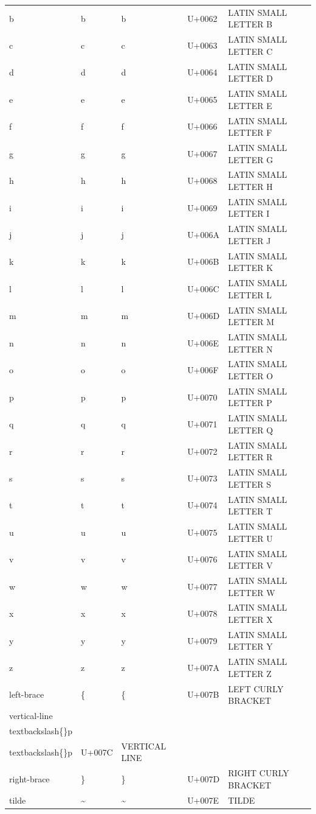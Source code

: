 \documentclass{article}
\begin{document}
\begin{tabular}{lllll}
b & b & b & U+0062 & LATIN SMALL LETTER B \\
c & c & c & U+0063 & LATIN SMALL LETTER C \\
d & d & d & U+0064 & LATIN SMALL LETTER D \\
e & e & e & U+0065 & LATIN SMALL LETTER E \\
f & f & f & U+0066 & LATIN SMALL LETTER F \\
g & g & g & U+0067 & LATIN SMALL LETTER G \\
h & h & h & U+0068 & LATIN SMALL LETTER H \\
i & i & i & U+0069 & LATIN SMALL LETTER I \\
j & j & j & U+006A & LATIN SMALL LETTER J \\
k & k & k & U+006B & LATIN SMALL LETTER K \\
l & l & l & U+006C & LATIN SMALL LETTER L \\
m & m & m & U+006D & LATIN SMALL LETTER M \\
n & n & n & U+006E & LATIN SMALL LETTER N \\
o & o & o & U+006F & LATIN SMALL LETTER O \\
p & p & p & U+0070 & LATIN SMALL LETTER P \\
q & q & q & U+0071 & LATIN SMALL LETTER Q \\
r & r & r & U+0072 & LATIN SMALL LETTER R \\
s & s & s & U+0073 & LATIN SMALL LETTER S \\
t & t & t & U+0074 & LATIN SMALL LETTER T \\
u & u & u & U+0075 & LATIN SMALL LETTER U \\
v & v & v & U+0076 & LATIN SMALL LETTER V \\
w & w & w & U+0077 & LATIN SMALL LETTER W \\
x & x & x & U+0078 & LATIN SMALL LETTER X \\
y & y & y & U+0079 & LATIN SMALL LETTER Y \\
z & z & z & U+007A & LATIN SMALL LETTER Z \\
left-brace & \{ & \{ & U+007B & LEFT CURLY BRACKET \\
vertical-line & \\textbackslash\{\}p & \\textbackslash\{\}p & U+007C & VERTICAL LINE \\
right-brace & \} & \} & U+007D & RIGHT CURLY BRACKET \\
tilde & \textasciitilde{} & \textasciitilde{} & U+007E & TILDE \\
\bottomrule
\end{tabular}
\end{document}
